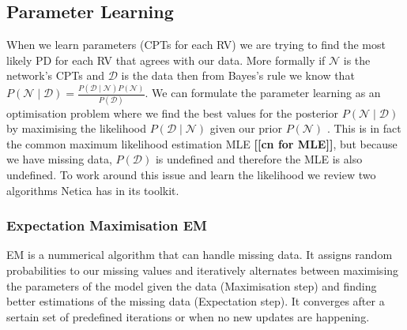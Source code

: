 \documentclass{UoYCSproject}
\begin{document}
\subsection{Parameter Learning}
\label{subsec:param_learning}
When we learn parameters (CPTs for each RV) we are trying to find the most likely PD for each RV that agrees with our data. More formally if \(\mathcal{N}\) is the network's CPTs and \(\mathcal{D}\) is the data then from Bayes's rule we know that \(P(\mathcal{N} \mid \mathcal{D}) = \frac{P(\mathcal{D} \mid \mathcal{N})P(\mathcal{N})}{P(\mathcal{D})}\). We can formulate the parameter learning as an optimisation problem where we find the best values for the posterior \(P(\mathcal{N} \mid \mathcal{D})\) by maximising the likelihood \(P(\mathcal{D} \mid \mathcal{N})\) given our prior \(P(\mathcal{N})\) \parencite[46-48]{neticaCman}. This is in fact the common maximum likelihood estimation MLE \textbf{[[cn for MLE]]}, but because we have missing data, \(P(\mathcal{D})\) is undefined and therefore the MLE is also undefined. To work around this issue and learn the likelihood we review two algorithms Netica has in its toolkit.
 

\subsubsection{Expectation Maximisation EM} %
EM \parencite{EMAlgorithm} is a nummerical algorithm that can handle missing data. It assigns random probabilities to our missing values and iteratively alternates between maximising the parameters of the model given the data (Maximisation step) and finding better estimations of the missing data (Expectation step). It converges after a sertain set of predefined iterations or when no new updates are happening. 
\end{document}
